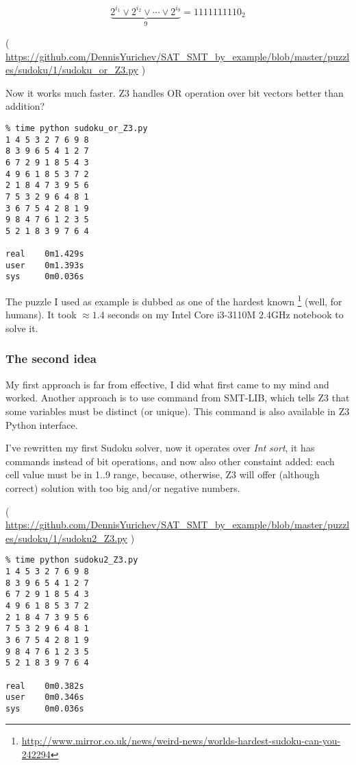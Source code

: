\begin{equation}
\underbrace{2^{i_1} \vee 2^{i_2} \vee \cdots \vee 2^{i_9}}_9 = 1111111110_2
\end{equation}


( \url{https://github.com/DennisYurichev/SAT_SMT_by_example/blob/master/puzzles/sudoku/1/sudoku_or_Z3.py} )

Now it works much faster. Z3 handles OR operation over bit vectors better than addition?

\begin{lstlisting}
% time python sudoku_or_Z3.py
1 4 5 3 2 7 6 9 8
8 3 9 6 5 4 1 2 7
6 7 2 9 1 8 5 4 3
4 9 6 1 8 5 3 7 2
2 1 8 4 7 3 9 5 6
7 5 3 2 9 6 4 8 1
3 6 7 5 4 2 8 1 9
9 8 4 7 6 1 2 3 5
5 2 1 8 3 9 7 6 4

real    0m1.429s
user    0m1.393s
sys     0m0.036s
\end{lstlisting}

The puzzle I used as example is dubbed as one of the hardest known
\footnote{\url{http://www.mirror.co.uk/news/weird-news/worlds-hardest-sudoku-can-you-242294}} (well, for humans).
It took $\approx 1.4$ seconds on my Intel Core i3-3110M 2.4GHz notebook to solve it.

\subsubsection{The second idea}

My first approach is far from effective, I did what first came to my mind and worked.
Another approach is to use  command from SMT-LIB, which tells Z3 that some variables must be distinct (or unique).
This command is also available in Z3 Python interface.

I've rewritten my first Sudoku solver, now it operates over \textit{Int} \textit{sort}, it has  commands instead of bit operations,
and now also other constaint added: each cell value must be in 1..9 range, because, otherwise, Z3 will offer (although correct) solution with too big
and/or negative numbers.


( \url{https://github.com/DennisYurichev/SAT_SMT_by_example/blob/master/puzzles/sudoku/1/sudoku2_Z3.py} )

\begin{lstlisting}
% time python sudoku2_Z3.py
1 4 5 3 2 7 6 9 8
8 3 9 6 5 4 1 2 7
6 7 2 9 1 8 5 4 3
4 9 6 1 8 5 3 7 2
2 1 8 4 7 3 9 5 6
7 5 3 2 9 6 4 8 1
3 6 7 5 4 2 8 1 9
9 8 4 7 6 1 2 3 5
5 2 1 8 3 9 7 6 4

real    0m0.382s
user    0m0.346s
sys     0m0.036s
\end{lstlisting}

